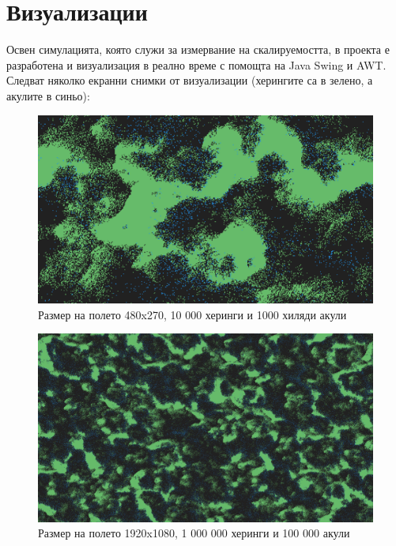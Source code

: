 \documentclass{article}
\begin{document}


\section{Визуализации}
Освен симулацията, която служи за измервание на скалируемостта,
в проекта е разработена и визуализация в реално време с помощта на Java Swing и AWT.
Следват няколко екранни снимки от визуализации (херингите са в зелено, а акулите в синьо):

\begin{figure}[H]
	\centering
	\includegraphics[width=1\textwidth]{screenshot-small.png}
	\caption{Размер на полето 480x270, 10 000 херинги и 1000 хиляди акули}
\end{figure}

\begin{figure}[H]
	\centering
	\includegraphics[width=1\textwidth]{screenshot-big.png}
	\caption{Размер на полето 1920x1080, 1 000 000 херинги и 100 000 акули}
\end{figure}
\end{document}
